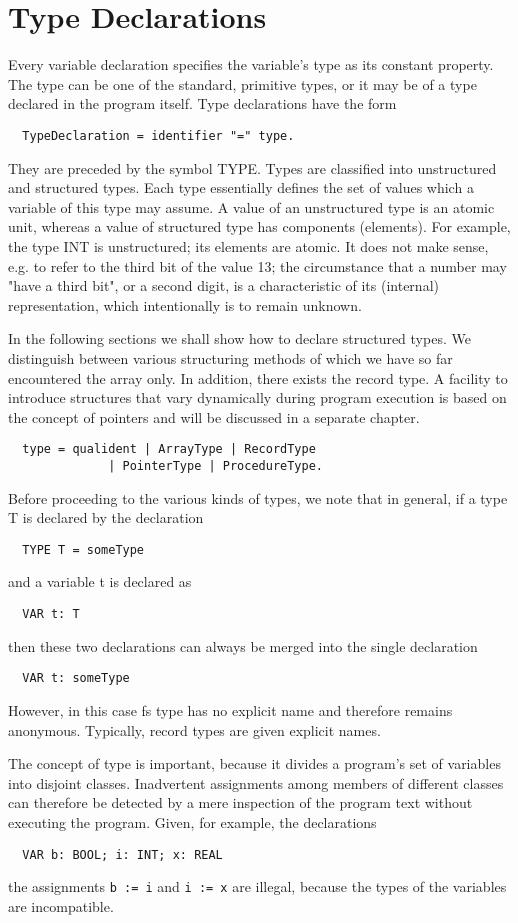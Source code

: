 \chapter{Type Declarations}
Every variable declaration specifies the variable's type as its constant property. The type can be
one of the standard, primitive types, or it may be of a type declared in the program itself. Type
declarations have the form
\begin{verbatim}
  TypeDeclaration = identifier "=" type.
\end{verbatim}
They are preceded by the symbol TYPE. Types are classified into unstructured and structured
types. Each type essentially defines the set of values which a variable of this type may assume. A
value of an unstructured type is an atomic unit, whereas a value of structured type has components
(elements). For example, the type INT is unstructured; its elements are atomic. It does not
make sense, e.g. to refer to the third bit of the value 13; the circumstance that a number may "have
a third bit", or a second digit, is a characteristic of its (internal) representation, which intentionally is
to remain unknown.

In the following sections we shall show how to declare structured types. We distinguish between
various structuring methods of which we have so far encountered the array only. In addition, there
exists the record type. A facility to introduce structures that vary dynamically during program
execution is based on the concept of pointers and will be discussed in a separate chapter.
\begin{verbatim}
  type = qualident | ArrayType | RecordType
              | PointerType | ProcedureType.
\end{verbatim}
Before proceeding to the various kinds of types, we note that in general, if a type T is declared by
the declaration
\begin{verbatim}
  TYPE T = someType
\end{verbatim}
and a variable t is declared as
\begin{verbatim}
  VAR t: T
\end{verbatim}
then these two declarations can always be merged into the single declaration
\begin{verbatim}
  VAR t: someType
\end{verbatim}
However, in this case fs type has no explicit name and therefore remains anonymous. Typically,
record types are given explicit names.

The concept of type is important, because it divides a program's set of variables into disjoint
classes. Inadvertent assignments among members of different classes can therefore be detected
by a mere inspection of the program text without executing the program. Given, for example, the
declarations
\begin{verbatim}
  VAR b: BOOL; i: INT; x: REAL
\end{verbatim}
the assignments \verb|b := i| and \verb|i := x| are illegal, because the types of the variables
are incompatible.
